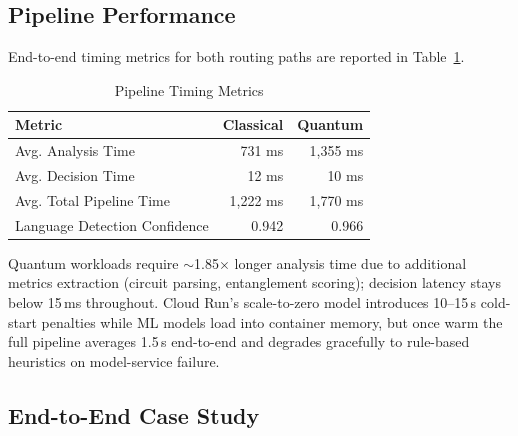 \documentclass[10pt,conference]{IEEEtran}
\begin{document}
\subsection{Pipeline Performance}

End-to-end timing metrics for both routing paths are reported in Table~\ref{tab:pipeline-timing}.

\begin{table}[htbp]
\caption{Pipeline Timing Metrics}
\label{tab:pipeline-timing}
\centering
\footnotesize
\begin{tabular}{p{} r r}
\toprule
\textbf{Metric} & \textbf{Classical} & \textbf{Quantum} \\
\midrule
Avg. Analysis Time & 731 ms & 1,355 ms \\
Avg. Decision Time & 12 ms & 10 ms \\
Avg. Total Pipeline Time & 1,222 ms & 1,770 ms \\
Language Detection Confidence & 0.942 & 0.966 \\
\bottomrule
\end{tabular}
\end{table}

Quantum workloads require $\sim$1.85$\times$ longer analysis time due to additional metrics extraction (circuit parsing, entanglement scoring); decision latency stays below 15\,ms throughout. Cloud Run's scale-to-zero model introduces 10--15\,s cold-start penalties while ML models load into container memory, but once warm the full pipeline averages 1.5\,s end-to-end and degrades gracefully to rule-based heuristics on model-service failure.

\subsection{End-to-End Case Study}
\end{document}
